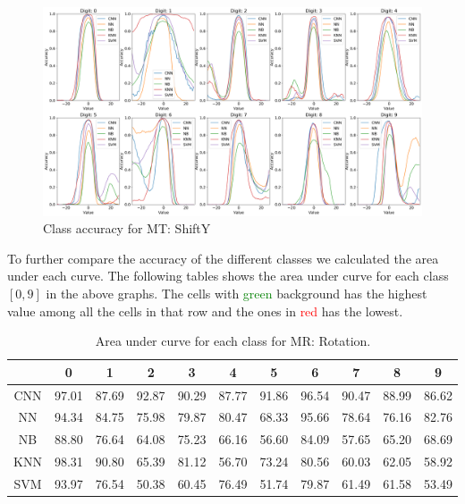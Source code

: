     \begin{figure}[H]
    \centering
        \includegraphics[width=\textwidth]{chapters/results/MT/ShiftYAll.png}
        \caption{Class accuracy for MT: ShiftY}
        \label{fig:Rotate-misclass0}
    \end{figure}
    
    To further compare the accuracy of the different classes we calculated the area under each curve. The following tables shows the area under curve for each class $[0,9]$ in the above graphs. The cells with \textcolor{green}{green} background has the highest value among all the cells in that row and the ones in \textcolor{red}{red} has the lowest.
    \begin{table}[H]
    \centering
        \begin{tabular}{|c|c|c|c|c|c|c|c|c|c|c|}
        \hline
         & 0 & 1 & 2 & 3 & 4 & 5 & 6 & 7 & 8 & 9 \\
        \hline
        CNN & \cellcolor{green!25} 97.01 & 87.69 & 92.87 & 90.29 & 87.77 & 91.86 & 96.54 & 90.47 & 88.99 & \cellcolor{red!25}86.62 \\ 
        \hline
        NN &   94.34 & 84.75 & 75.98 & 79.87 & 80.47 & \cellcolor{red!25}68.33 & \cellcolor{green!25}95.66 & 78.64 & 76.16 & 82.76 \\
        \hline
        NB & \cellcolor{green!25}88.80 & 76.64 & 64.08 & 75.23 & 66.16 & \cellcolor{red!25}56.60 & 84.09 & 57.65 & 65.20 & 68.69 \\
        \hline
        KNN & \cellcolor{green!25}98.31 & 90.80 & 65.39 & 81.12 & \cellcolor{red!25}56.70 & 73.24 & 80.56 & 60.03 & 62.05 & 58.92 \\
        \hline
        SVM & \cellcolor{green!25}93.97 & 76.54 & \cellcolor{red!25}50.38 & 60.45 & 76.49 & 51.74 & 79.87 & 61.49 & 61.58 & 53.49 \\
        \hline
        \end{tabular}
        \caption{Area under curve for each class for MR: Rotation.}
        \label{tbl:test-file-formatRotate}
    \end{table}
    
